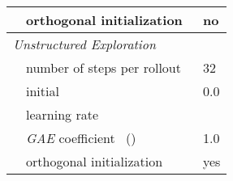 \documentclass{article}
\begin{document}
\begin{table}[h]
\begin{tabular}{@{}l l| l@{}}
    & orthogonal initialization~\citep{engstrom2020implementation} & no \\
    \midrule
    \multicolumn{2}{l|}{\textit{Unstructured Exploration}}& \\
    & number of steps per rollout & 32\\
    & initial  & 0.0\\
    & learning rate & \\
    & \textit{GAE} coefficient~\citep{schulman2015high} () &  1.0\\
    & orthogonal initialization~\citep{engstrom2020implementation} & yes \\

    \bottomrule
  \end{tabular}
\end{table}
\end{document}
